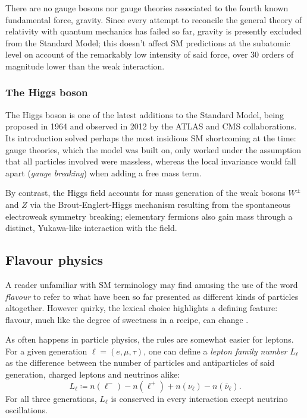 There are no gauge bosons nor gauge theories associated to the fourth known fundamental force, gravity.
Since every attempt to reconcile the general theory of relativity with quantum mechanics has failed so far, gravity is presently excluded from the Standard Model;
this doesn't affect SM predictions at the subatomic level on account of the remarkably low intensity of said force, over 30 orders of magnitude lower than the weak interaction.

\subsubsection{The Higgs boson} 
The Higgs boson is one of the latest additions to the Standard Model, being proposed in 1964 \cite{higgs1964} and observed in 2012 by the ATLAS \cite{atlasHiggs} and CMS \cite{cmsHiggs} collaborations.
Its introduction solved perhaps the most insidious SM shortcoming at the time: gauge theories, which the model was built on, only worked under the assumption that all particles involved were massless, whereas the local invariance would fall apart (\textit{gauge breaking}) when adding a free mass term.

By contrast, the Higgs field accounts for mass generation of the weak bosons $W^\pm$ and $Z$ via the Brout-Englert-Higgs mechanism resulting from the spontaneous electroweak symmetry breaking;
elementary fermions also gain mass through a distinct, Yukawa-like interaction with the field.

\subsection{Flavour physics} \label{sec:flavour-physics}
A reader unfamiliar with SM terminology may find amusing the use of the word \textit{flavour} to refer to what have been so far presented as different kinds of particles altogether.
However quirky, the lexical choice highlights a defining feature: flavour, much like the degree of sweetness in a recipe, can change \cite{flavour}.

As often happens in particle physics, the rules are somewhat easier for leptons. For a given generation $\ell = (e,\mu,\tau)$, one can define a \textit{lepton family number} $L_\ell$ as the difference between the number of particles and antiparticles of said generation, charged leptons and neutrinos alike:
\begin{equation}
L_\ell
\coloneqq
n(\ell^-) - n(\ell^+)
+
n(\nu_\ell) - n(\bar{\nu}_\ell).
\end{equation}
For all three generations, $L_\ell$ is conserved in every interaction except neutrino oscillations.


